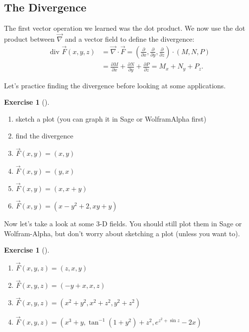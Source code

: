 \documentclass[10pt,]{book}
\theoremstyle{plain}
\theoremstyle{definition}
\theoremstyle{definition}
\theoremstyle{definition}
\theoremstyle{definition}
\newtheorem{exploration}[project]{Exercise}
\theoremstyle{definition}
\numberwithin{equation}{section}
\newcommand{\amp}{&}
\begin{document}
\subsection[{The Divergence}]{The Divergence}\label{subsection-36}
The first vector operation we learned was the dot product. We now use the dot product between \(\vec \nabla\) and a vector field to define the divergence:%
\begin{align*}
\text{ div } \vec F(x,y,z) 
\amp = \vec \nabla\cdot \vec F 
= \left(\frac{\partial }{\partial x},\frac{\partial }{\partial y},\frac{\partial }{\partial z} \right)\cdot (M,N,P)\\
\amp = \frac{\partial M}{\partial x}+\frac{\partial N}{\partial y}+\frac{\partial P}{\partial z} 
= M_x+N_y+P_z 
.
\end{align*}
%
\par
Let's practice finding the divergence before looking at some applications.%
\begin{exploration}[]\label{x2d_div}
\leavevmode%
\begin{enumerate}[font=\bfseries,label=(\alph*),ref=\alph*]
\item\label{task-776} sketch a plot (you can graph it in Sage or WolframAlpha first)  %
\item\label{task-777} find the divergence%
\item\label{task-778} \(\vec{F}(x,y)=(x,y)\)%
\item\label{task-779} \(\vec{F}(x,y)=(y,x)\)%
\item\label{task-780} \(\vec{F}(x,y)=(x,x+y)\)%
\item\label{task-781} \(\vec{F}(x,y)=(x-y^2+2, xy+y)\)%
\end{enumerate}
\end{exploration}
Now let's take a look at some 3-D fields. You should still plot them in Sage or Wolfram-Alpha, but don't worry about sketching a plot (unless you want to).%
\begin{exploration}[]\label{x3d_div}
\leavevmode%
\begin{enumerate}[font=\bfseries,label=(\alph*),ref=\alph*]
\item\label{task-782} \(\vec F(x,y,z) = \left(z,x,y \right)\)%
\item\label{task-783} \(\vec F(x,y,z) = \left(-y+x,x,z \right)\)%
\item\label{task-784} \(\vec F(x,y,z) = \left(x^2+y^2,x^2+z^2,y^2+z^2 \right)\)%
\item\label{task-785} \(\vec F(x,y,z) = \left(x^3+y,\tan^{-1}(1+y^2) + z^2,e^{z^2+\sin z} -2x\right)\)%
\end{enumerate}
\end{exploration}
\typeout{************************************************}
\typeout{************************************************}
\end{document}

